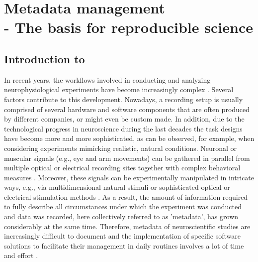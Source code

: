 \clearpage
\chapter[Metadata management]{Metadata management\\- The basis for reproducible science}
\label{sec:metadata}


\section{Introduction to }
\label{sec:Introduction}

In recent years, the workflows involved in conducting and analyzing neurophysiological experiments have become increasingly complex \citep[e.g.][]{Coles_2008, Denker_2016, Brochier_2018}. Several factors contribute to this development. Nowadays, a recording setup is usually comprised of several hardware and software components that are often produced by different companies, or might even be custom made. In addition, due to the technological progress in neuroscience during the last decades the task designs have become more and more sophisticated, as can be observed, for example, when considering experiments mimicking realistic, natural conditions. Neuronal or muscular signals (e.g., eye and arm movements) can be gathered in parallel from multiple optical or electrical recording sites \citep{Nicolelis_2002,Verkhratsky_2006,Obien_2014} together with complex behavioral measures \citep{Jacob_2010,Maldonado_2008,Vargas-Irwin_2010,Schwarz_2014}. Moreover, these signals can be experimentally manipulated in intricate ways, e.g., via multidimensional natural stimuli \citep{Geisler_2008} or sophisticated optical or electrical stimulation methods \citep{Deisseroth_2013,Miyamoto_2015}. As a result, the amount of information required to fully describe all circumstances under which the experiment was conducted and data was recorded, here collectively referred to as 'metadata', has grown considerably at the same time. Therefore, metadata of neuroscientific studies are increasingly difficult to document and the implementation of specific software solutions to facilitate their management in daily routines involves a lot of time and effort \citep{Zehl_2016}.

